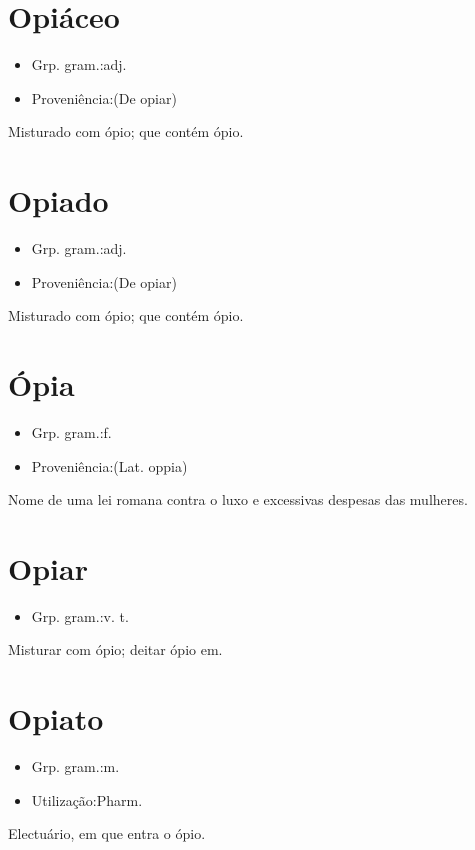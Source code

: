 \section{Opiáceo}
\begin{itemize}
\item {Grp. gram.:adj.}
\end{itemize}
\begin{itemize}
\item {Proveniência:(De \textunderscore opiar\textunderscore )}
\end{itemize}
Misturado com ópio; que contém ópio.
\section{Opiado}
\begin{itemize}
\item {Grp. gram.:adj.}
\end{itemize}
\begin{itemize}
\item {Proveniência:(De \textunderscore opiar\textunderscore )}
\end{itemize}
Misturado com ópio; que contém ópio.
\section{Ópia}
\begin{itemize}
\item {Grp. gram.:f.}
\end{itemize}
\begin{itemize}
\item {Proveniência:(Lat. \textunderscore oppia\textunderscore )}
\end{itemize}
Nome de uma lei romana contra o luxo e excessivas despesas das mulheres.
\section{Opiar}
\begin{itemize}
\item {Grp. gram.:v. t.}
\end{itemize}
Misturar com ópio; deitar ópio em.
\section{Opiato}
\begin{itemize}
\item {Grp. gram.:m.}
\end{itemize}
\begin{itemize}
\item {Utilização:Pharm.}
\end{itemize}
Electuário, em que entra o ópio.
